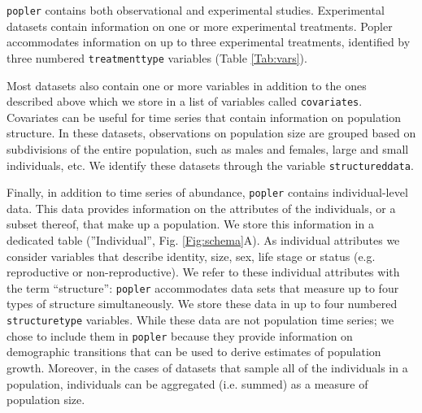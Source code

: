 \documentclass{article}\usepackage[]{graphicx}\usepackage[]{color}
\begin{document}
\texttt{popler} contains both observational and experimental studies. Experimental datasets contain information on one or more experimental treatments. Popler accommodates information on up to three experimental treatments, identified by three numbered \texttt{treatment\textunderscore type} variables (Table \ref{Tab:vars}). 

Most datasets also contain one or more variables in addition to the ones described above which we store in a list of variables called \texttt{covariates}. Covariates can be useful for time series that contain information on population structure. In these datasets, observations on population size are grouped based on subdivisions of the entire population, such as males and females, large and small individuals, etc. We identify these datasets through the variable \texttt{structured\textunderscore data}.

Finally, in addition to time series of abundance, \texttt{popler} contains individual-level data. This data provides information on the attributes of the individuals, or a subset thereof, that make up a population. We store this information in a dedicated table (''Individual'', Fig. \ref{Fig:schema}A). As individual attributes we consider variables that describe identity, size, sex, life stage or status (e.g. reproductive or non-reproductive). We refer to these individual attributes with the term ``structure'': \texttt{popler} accommodates data sets that measure up to four types of structure simultaneously. We store these data in up to four numbered \texttt{structure\textunderscore type} variables. While these data are not population time series; we chose to include them in \texttt{popler} because they provide information on demographic transitions that can be used to derive estimates of population growth. Moreover, in the cases of datasets that sample all of the individuals in a population, individuals can be aggregated (i.e. summed) as a measure of population size.
\end{document}
